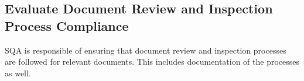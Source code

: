 \documentclass{article}
\begin{document}
	\subsection{Evaluate Document Review and Inspection Process Compliance}
	SQA is responsible of ensuring that document review and inspection processes are followed for relevant documents. This includes documentation of the processes as well. 
	
	\begin{comment}
		
	
	a.	Verify that the correct participants are involved in the system requirements analysis process to identify all user needs.
	b.	Verify that requirements are reviewed to determine if they are feasible to implement, clearly stated, and consistent.
	c.	Verify that changes to allocated requirements, work products and activities are identified, reviewed, and tracked to closure.
	d.	Verify that project personnel involved in the system requirements analysis process are trained in the necessary procedures and standards applicable to their area of responsibility to do the job correctly.
	e.	Verify that the commitments resulting from allocated requirements are negotiated and agreed upon by the affected groups.
	f.	Verify that commitments are documented, communicated, reviewed, and accepted.
	g.	Verify that allocated requirements identified as having potential problems are reviewed with the group responsible for analyzing system requirements and documents, and that necessary changes are made.
	h.	Verify that the prescribed processes for defining, documenting, and allocating requirements are followed and documented.
	i.	Confirm that a configuration management process is in place to control and manage the baseline.
	j.	Verify that requirements are documented, managed, controlled, and traced (preferably via a matrix).
	k.	Verify that the agreed upon requirements are addressed in the SDP.
	SQA may use the audit checklist in Figure B-3 as a guide for conducting the evaluation.
	The results of this task shall be documented using the Process Audit Form described in Section 7 and provided to project management.  SQA recommendation for corrective action requires project management’s disposition and will be processed in accordance with the guidance in Section 7
	\end{comment}
	
	
\end{document}
